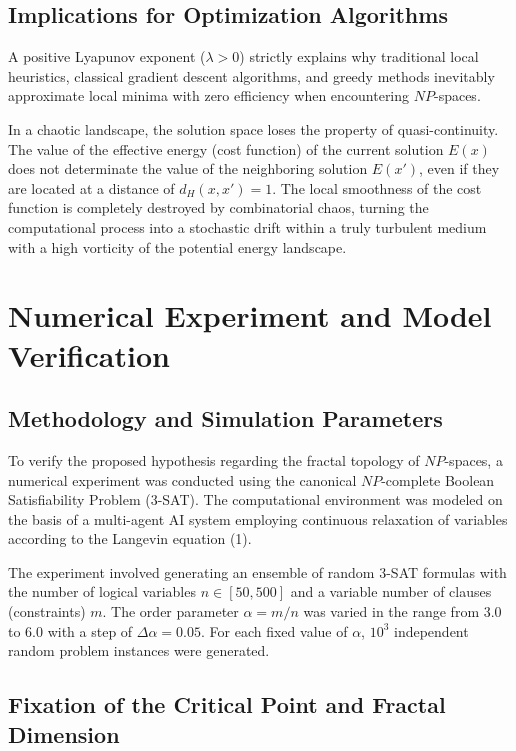 \documentclass[12pt,a4paper]{article}
\begin{document}
\subsection{Implications for Optimization Algorithms}

A positive Lyapunov exponent ($\lambda > 0$) strictly explains why traditional local heuristics, classical gradient descent algorithms, and greedy methods inevitably approximate local minima with zero efficiency when encountering $NP$-spaces.

In a chaotic landscape, the solution space loses the property of quasi-continuity. The value of the effective energy (cost function) of the current solution $E(x)$ does not determinate the value of the neighboring solution $E(x')$, even if they are located at a distance of $d_H(x, x') = 1$. The local smoothness of the cost function is completely destroyed by combinatorial chaos, turning the computational process into a stochastic drift within a truly turbulent medium with a high vorticity of the potential energy landscape.

\section{Numerical Experiment and Model Verification}

\subsection{Methodology and Simulation Parameters}

To verify the proposed hypothesis regarding the fractal topology of $NP$-spaces, a numerical experiment was conducted using the canonical $NP$-complete Boolean Satisfiability Problem (3-SAT). The computational environment was modeled on the basis of a multi-agent AI system employing continuous relaxation of variables according to the Langevin equation (1).

The experiment involved generating an ensemble of random 3-SAT formulas with the number of logical variables $n \in [50, 500]$ and a variable number of clauses (constraints) $m$. The order parameter $\alpha = m/n$ was varied in the range from $3.0$ to $6.0$ with a step of $\Delta\alpha = 0.05$. For each fixed value of $\alpha$, $10^3$ independent random problem instances were generated.

\subsection{Fixation of the Critical Point and Fractal Dimension}
\end{document}
